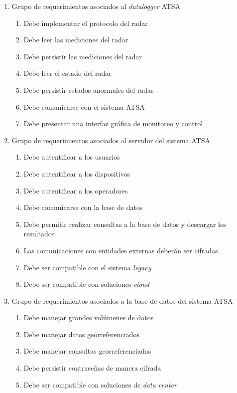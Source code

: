 \documentclass[
12pt,
spanish,
singlespacing,
parskip,
headsepline,]{article}
\begin{document}
\begin{enumerate}
	\item Grupo de requerimientos asociados al \emph{datalogger} ATSA
		\begin{enumerate}
			\item Debe implementar el protocolo del radar
			\item Debe leer las mediciones del radar
			\item Debe persistir las mediciones del radar
			\item Debe leer el estado del radar
			\item Debe persistir estados anormales del radar
			\item Debe comunicarse con el sistema ATSA
			\item Debe presentar una interfaz gráfica de monitoreo y control
		\end{enumerate}	
	\item Grupo de requerimientos asociados al servidor del sistema ATSA
		\begin{enumerate}
			\item Debe autentificar a los usuarios
			\item Debe autentificar a los dispositivos
			\item Debe autentificar a los operadores
			\item Debe comunicarse con la base de datos
			\item Debe permitir realizar consultas a la base de datos y descargar los resultados
			\item Las comunicaciones con entidades externas deberán ser cifradas
			\item Debe ser compatible con el sistema \emph{legacy}
			\item Debe ser compatible con soluciones \emph{cloud}
		\end{enumerate}
	\item Grupo de requerimientos asociados a la base de datos del sistema ATSA
		\begin{enumerate}
			\item Debe manejar grandes volúmenes de datos
			\item Debe manejar datos georreferenciados
			\item Debe manejar consultas georreferenciadas
			\item Debe persistir contraseñas de manera cifrada
			\item Debe ser compatible con soluciones de \emph{data center}
		\end{enumerate}

\end{enumerate}
\end{document}
